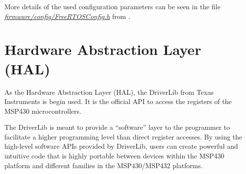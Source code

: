 More details of the used configuration parameters can be seen in the file \textit{\href{https://github.com/spacelab-ufsc/obdh2/blob/master/firmware/config/FreeRTOSConfig.h}{firmware/config/FreeRTOSConfig.h}} from \cite{obdh2-repo}.

\section{Hardware Abstraction Layer (HAL)}

As the Hardware Abstraction Layer (HAL), the DriverLib \cite{driverlib} from Texas Instruments is begin used. It is the official API to access the registers of the MSP430 microcontrollers.

The DriverLib is meant to provide a ``software'' layer to the programmer to facilitate a higher programming level than direct register accesses. By using the high-level software APIs provided by DriverLib, users can create powerful and intuitive code that is highly portable between devices within the MSP430 platform and different families in the MSP430/MSP432 platforms.



